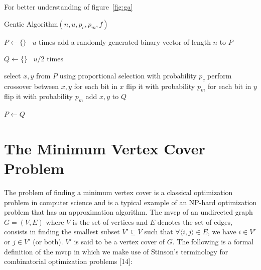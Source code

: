 \documentclass[12pt]{article}
\begin{document}
For better understanding of figure~\ref{fig:ga}
\begin{algorithm}
\caption{Gentic Algorithm$\left( n, u, p_c, p_m, f \right)$}
\label{alg:ga}

\begin{algorithmic}[1]


\State $ P \gets \{ \} $
\Loop \ $u$ times
\State add a randomly generated binary vector of length $n$ to $P$
\EndLoop

\State $Q \gets \{ \}$
\Loop \ $u/2$ times

\State select $x, y$ from $P$ using proportional selection
\State with probability $p_c$ perform crossover between $x, y$
\State for each bit in $x$ flip it with probability $p_m$
\State for each bit in $y$ flip it with probability $p_m$
\State add $x, y$ to $Q$

\EndLoop

\State $P \gets Q$
\EndWhile


\end{algorithmic}

\end{algorithm}


\section{The Minimum Vertex Cover Problem}
The problem of finding a minimum vertex cover is a classical
optimization problem in computer science and is a typical
example of an NP-hard optimization problem that has an
approximation algorithm.
The mvcp of an undirected graph $G = (V, E)$ where $V$ is
the set of vertices and $E$ denotes the set of edges, consists
in finding the smallest subset $V' \subseteq V$ such that
$\forall \langle i, j \rangle \in E$, we have $i \in V'$ or $j \in V'$ (or both).
$V'$ is said to be a vertex cover of $G$. The following is a formal definition of
the mvcp in which we make use of Stinson's terminology
for combinatorial optimization problems [14]:
\end{document}
